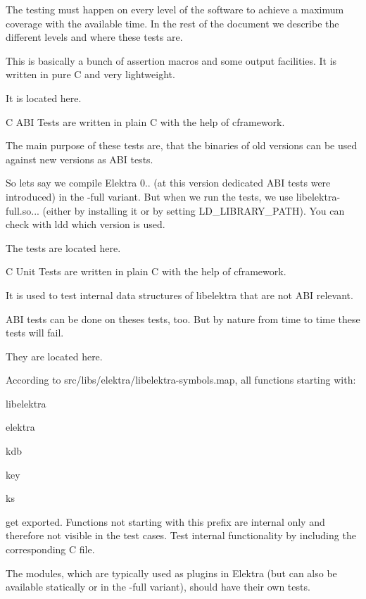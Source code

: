 The testing must happen on every level of the software to achieve a maximum coverage with the available time. In the rest of the document we describe the different levels and where these tests are.

This is basically a bunch of assertion macros and some output facilities. It is written in pure C and very lightweight.

It is located here.

C A\+BI Tests are written in plain C with the help of {\ttfamily cframework}.

The main purpose of these tests are, that the binaries of old versions can be used against new versions as A\+BI tests.

So lets say we compile Elektra 0.. (at this version dedicated A\+BI tests were introduced) in the {\ttfamily -\/full} variant. But when we run the tests, we use {\ttfamily libelektra-\/full.\+so...} (either by installing it or by setting {\ttfamily L\+D\+\_\+\+L\+I\+B\+R\+A\+R\+Y\+\_\+\+P\+A\+TH}). You can check with {\ttfamily ldd} which version is used.

The tests are located here.

C Unit Tests are written in plain C with the help of {\ttfamily cframework}.

It is used to test internal data structures of libelektra that are not A\+BI relevant.

A\+BI tests can be done on theses tests, too. But by nature from time to time these tests will fail.

They are located here.

According to {\ttfamily src/libs/elektra/libelektra-\/symbols.\+map}, all functions starting with\+:


\begin{DoxyItemize}
\item {\ttfamily libelektra}
\item {\ttfamily elektra}
\item {\ttfamily kdb}
\item {\ttfamily key}
\item {\ttfamily ks}
\end{DoxyItemize}

get exported. Functions not starting with this prefix are internal only and therefore not visible in the test cases. Test internal functionality by including the corresponding C file.

The modules, which are typically used as plugins in Elektra (but can also be available statically or in the {\ttfamily -\/full} variant), should have their own tests.


